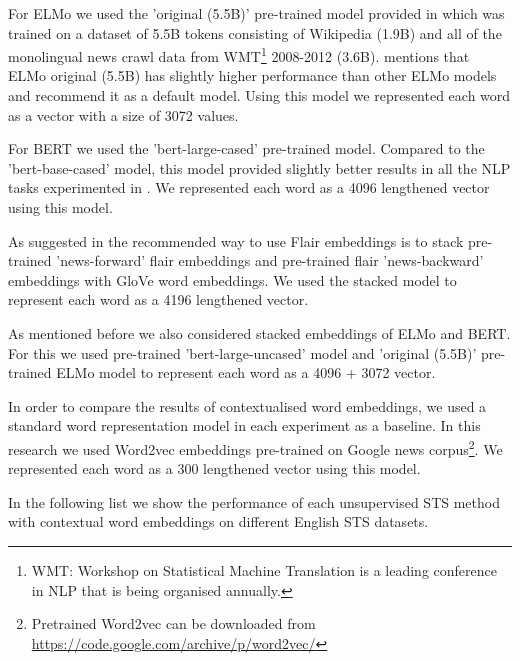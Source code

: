 For ELMo we used the 'original (5.5B)' pre-trained model provided in \citet{peters-etal-2018-deep} which was trained on a dataset of 5.5B tokens consisting of Wikipedia (1.9B) and all of the monolingual news crawl data from WMT\footnote{WMT: Workshop on Statistical Machine Translation is a leading conference in NLP that is being organised annually.} 2008-2012 (3.6B). \citet{peters-etal-2018-deep} mentions that ELMo original (5.5B) has slightly higher performance than other ELMo models and recommend it as a default model. Using this model we represented each word as a vector with a size of 3072 values.

For BERT we used the 'bert-large-cased' pre-trained model. Compared to the 'bert-base-cased' model, this model provided slightly better results in all the NLP tasks experimented in \citet{devlin-etal-2019-bert}. We represented each word as a 4096 lengthened vector using this model. 

As suggested in \citet{akbik-etal-2018-contextual} the recommended way to use Flair embeddings is to stack pre-trained 'news-forward' flair embeddings and pre-trained flair 'news-backward' embeddings with GloVe \cite{pennington-etal-2014-glove} word embeddings. We used the stacked model to represent each word as a 4196 lengthened vector. 

As mentioned before we also considered stacked embeddings of ELMo and BERT. For this we used pre-trained 'bert-large-uncased' model and 'original (5.5B)' pre-trained ELMo model to represent each word as a 4096 + 3072 vector.

In order to compare the results of contextualised word embeddings, we used a standard word representation model in each experiment as a baseline. In this research we used Word2vec embeddings \cite{DBLP:journals/corr/abs-1301-3781} pre-trained on Google news corpus\footnote{Pretrained Word2vec can be downloaded from \url{https://code.google.com/archive/p/word2vec/}}. We represented each word as a 300 lengthened vector using this model.

In the following list we show the performance of each unsupervised STS method with contextual word embeddings on different English STS datasets. 

